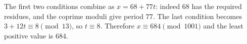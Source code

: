 The first two conditions combine as $ x=68+77t $: indeed $ 68 $ has the required residues, and the coprime moduli give period $ 77 $. The last condition becomes $ 3+12t\equiv8\pmod{13}$, so $ t\equiv8 $. Therefore $ x\equiv684\pmod{1001}$ and the least positive value is $\boxed{684}$.
